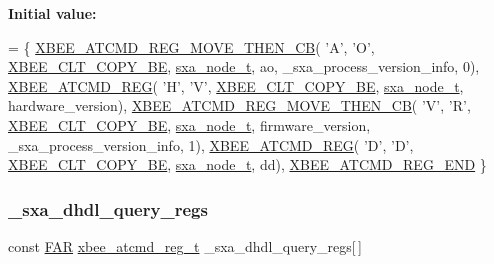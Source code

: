 {\bfseries Initial value\+:}
\begin{DoxyCode}
= \{
   \hyperlink{group__xbee__atcmd_gaf5f12cd2d94f9f4ecf0a679196a6ed21}{XBEE\_ATCMD\_REG\_MOVE\_THEN\_CB}( \textcolor{charliteral}{'A'}, \textcolor{charliteral}{'O'}, 
      \hyperlink{group__xbee__atcmd_gga1bd8ecd38c107579d20ded3c79a7d70ba0be0c682bc30049849b0c169b661c537}{XBEE\_CLT\_COPY\_BE},
                  \hyperlink{structsxa__node__t}{sxa\_node\_t}, ao,
                  \_sxa\_process\_version\_info, 0),
   \hyperlink{group__xbee__atcmd_gaafe33c3d8ea48b42b25d1183eaf93071}{XBEE\_ATCMD\_REG}( \textcolor{charliteral}{'H'}, \textcolor{charliteral}{'V'}, \hyperlink{group__xbee__atcmd_gga1bd8ecd38c107579d20ded3c79a7d70ba0be0c682bc30049849b0c169b661c537}{XBEE\_CLT\_COPY\_BE}, 
      \hyperlink{structsxa__node__t}{sxa\_node\_t}, hardware\_version),
   \hyperlink{group__xbee__atcmd_gaf5f12cd2d94f9f4ecf0a679196a6ed21}{XBEE\_ATCMD\_REG\_MOVE\_THEN\_CB}( \textcolor{charliteral}{'V'}, \textcolor{charliteral}{'R'}, 
      \hyperlink{group__xbee__atcmd_gga1bd8ecd38c107579d20ded3c79a7d70ba0be0c682bc30049849b0c169b661c537}{XBEE\_CLT\_COPY\_BE},
                  \hyperlink{structsxa__node__t}{sxa\_node\_t}, firmware\_version,
                  \_sxa\_process\_version\_info, 1),
   \hyperlink{group__xbee__atcmd_gaafe33c3d8ea48b42b25d1183eaf93071}{XBEE\_ATCMD\_REG}( \textcolor{charliteral}{'D'}, \textcolor{charliteral}{'D'}, \hyperlink{group__xbee__atcmd_gga1bd8ecd38c107579d20ded3c79a7d70ba0be0c682bc30049849b0c169b661c537}{XBEE\_CLT\_COPY\_BE}, 
      \hyperlink{structsxa__node__t}{sxa\_node\_t}, dd),
   \hyperlink{group__xbee__atcmd_ga22fe547f7ae9fd0b090c5e45f03c162d}{XBEE\_ATCMD\_REG\_END}
\}
\end{DoxyCode}
\mbox{\label{group___s_x_a_ga6fccbd755db52c5f1da42d07f76fcb11}} 
\subsubsection{\texorpdfstring{\+\_\+sxa\+\_\+dhdl\+\_\+query\+\_\+regs}{\_sxa\_dhdl\_query\_regs}}
{\footnotesize\ttfamily const \hyperlink{group__hal_gaef060b3456fdcc093a7210a762d5f2ed}{F\+AR} \hyperlink{structxbee__atcmd__reg__t}{xbee\+\_\+atcmd\+\_\+reg\+\_\+t} \+\_\+sxa\+\_\+dhdl\+\_\+query\+\_\+regs\mbox{[}$\,$\mbox{]}}

